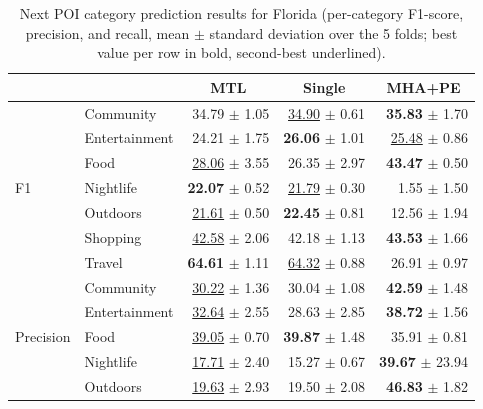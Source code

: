 \begin{table}[htbp]
\caption{Next POI category prediction results for Florida (per-category F1-score, precision, and recall, mean $\pm$ standard deviation over the 5 folds; best value per row in bold, second-best underlined).}
\label{tab:cbic:next}
\centering
\begin{tabular}{llrrr}
\toprule
 & & \multicolumn{1}{c}{\textbf{MTL}} & \multicolumn{1}{c}{\textbf{Single}} & \multicolumn{1}{c}{\textbf{MHA+PE}} \\
\midrule
\multirow{7}{*}{F1}        & Community     & 34.79 $\pm$ 1.05             & \underline{34.90} $\pm$ 0.61 & \textbf{35.83} $\pm$ 1.70 \\
                           & Entertainment & 24.21 $\pm$ 1.75             & \textbf{26.06} $\pm$ 1.01    & \underline{25.48} $\pm$ 0.86 \\
                           & Food          & \underline{28.06} $\pm$ 3.55 & 26.35 $\pm$ 2.97             & \textbf{43.47} $\pm$ 0.50 \\
                           & Nightlife     & \textbf{22.07} $\pm$ 0.52    & \underline{21.79} $\pm$ 0.30 & 1.55 $\pm$ 1.50 \\
                           & Outdoors      & \underline{21.61} $\pm$ 0.50 & \textbf{22.45} $\pm$ 0.81    & 12.56 $\pm$ 1.94 \\
                           & Shopping      & \underline{42.58} $\pm$ 2.06 & 42.18 $\pm$ 1.13             & \textbf{43.53} $\pm$ 1.66 \\
                           & Travel        & \textbf{64.61} $\pm$ 1.11    & \underline{64.32} $\pm$ 0.88 & 26.91 $\pm$ 0.97 \\
\midrule
\multirow{7}{*}{Precision} & Community     & \underline{30.22} $\pm$ 1.36 & 30.04 $\pm$ 1.08             & \textbf{42.59} $\pm$ 1.48 \\
                           & Entertainment & \underline{32.64} $\pm$ 2.55 & 28.63 $\pm$ 2.85             & \textbf{38.72} $\pm$ 1.56 \\
                           & Food          & \underline{39.05} $\pm$ 0.70             & \textbf{39.87} $\pm$ 1.48    & 35.91 $\pm$ 0.81 \\
                           & Nightlife     & \underline{17.71} $\pm$ 2.40 & 15.27 $\pm$ 0.67             & \textbf{39.67} $\pm$ 23.94 \\
                           & Outdoors      & \underline{19.63} $\pm$ 2.93 & 19.50 $\pm$ 2.08             & \textbf{46.83} $\pm$ 1.82 \\

\end{tabular}
\end{table}
